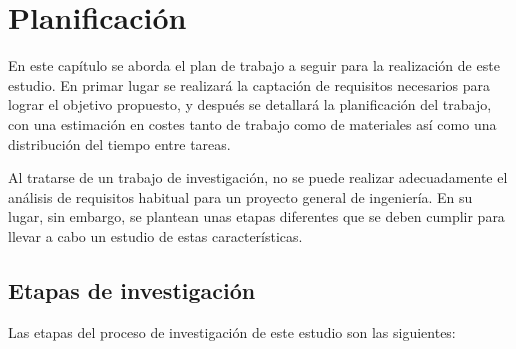 \chapter{Planificación}

En este capítulo se aborda el plan de trabajo a seguir para la realización de este estudio. En primar lugar se realizará la captación de requisitos necesarios para lograr el objetivo propuesto, y después se detallará la planificación del trabajo, con una estimación en costes tanto de trabajo como de materiales así como una distribución del tiempo entre tareas.

Al tratarse de un trabajo de investigación, no se puede realizar adecuadamente el análisis de requisitos habitual para un proyecto general de ingeniería. En su lugar, sin embargo, se plantean unas etapas diferentes que se deben cumplir para llevar a cabo un estudio de estas características.

\section{Etapas de investigación}

Las etapas del proceso de investigación de este estudio son las siguientes:

